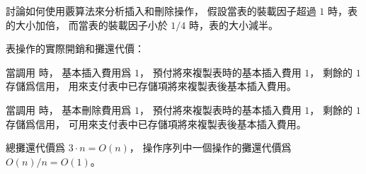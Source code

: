 \startEXERCISE
討論如何使用覈算法來分析插入和刪除操作，
假設當表的裝載因子超過 $1$ 時，表的大小加倍，
而當表的裝載因子小於 $1/4$ 時，表的大小減半。
\stopEXERCISE

\startANSWER
表操作的實際開銷和攤還代價：

當調用  時，
基本插入費用爲 $1$，
預付將來複製表時的基本插入費用 $1$，
剩餘的 $1$ 存儲爲信用，
用來支付表中已存儲項將來複製表後基本插入費用。

當調用  時，
基本刪除費用爲 $1$，
預付將來複製表時的基本插入費用 $1$，
剩餘的 $1$ 存儲爲信用，
可用來支付表中已存儲項將來複製表後基本插入費用。

總攤還代價爲 $3\cdot n = O(n)$，
操作序列中一個操作的攤還代價爲 $O(n)/n = O(1)$。
\stopANSWER
